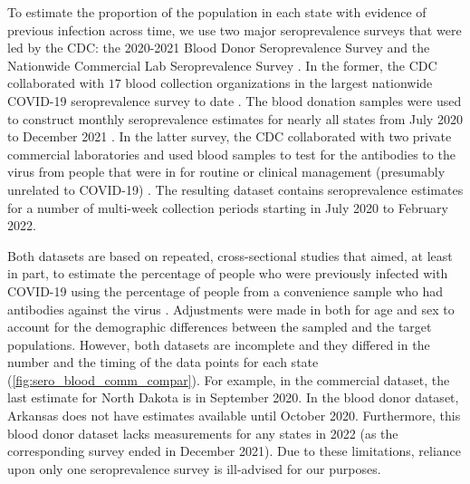 \documentclass{article}
\begin{document}
To estimate the proportion of the population in each state with evidence of
previous infection across time, we use two major seroprevalence surveys that
were led by the CDC: the 2020-2021 Blood Donor Seroprevalence Survey and the
Nationwide Commercial Lab Seroprevalence Survey \citep{cdc2021blood,
cdc2021comm}. In the former, the CDC collaborated with $17$ blood collection
organizations in the largest nationwide COVID-19 seroprevalence survey to date
\citep{cdc2021blood}. The blood donation samples were used to construct monthly
seroprevalence estimates for nearly all states from July 2020 to December 2021
\citep{jones2021estimated}. In the latter survey, the CDC collaborated with two
private commercial laboratories and used blood samples to test for the
antibodies to the virus from people that were in for routine or clinical
management (presumably unrelated to COVID-19) \citep{bajema2021estimated}. The
resulting dataset contains seroprevalence estimates for a number of multi-week
collection periods starting in July 2020 to February 2022. 

Both datasets are based on repeated, cross-sectional studies that aimed, at
least in part, to estimate the percentage of people who were previously infected
with COVID-19 using the percentage of people from a convenience sample who had
antibodies against the virus \citep{bajema2021estimated, cdc2020data,
jones2021estimated}. Adjustments were made in both for age and sex to account
for the demographic differences between the sampled and the target populations.
However, both datasets are incomplete and they differed in the number and the
timing of the data points for each state (\autoref{fig:sero_blood_comm_compar}).
For example, in the commercial dataset, the last estimate for North Dakota is in
September 2020. In the blood donor dataset, Arkansas does not have estimates
available until October 2020. Furthermore, this blood donor dataset lacks
measurements for any states in 2022 (as the corresponding survey ended in
December 2021). Due to these limitations, reliance upon only one seroprevalence
survey is ill-advised for our purposes. 
\end{document}
